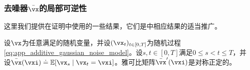 \documentclass[../../book-main_zh.tex]{subfiles}
\begin{document}
\subsubsection{去噪器\(\bar{\vx}\)的局部可逆性}

这里我们提供在证明中使用的一些结果，它们是\cite{Gribonval2011-pf}中相应结果的适当推广。

\begin{lemma}\label{lem:gribonval_A1}
    设\(\vx\)为任意满足的随机变量，并设\((\vx_{t})_{t \in [0, T]}\)为随机过程\eqref{eq:app_additive_gaussian_noise_model}。设\(s, t \in [0, T]\)满足\(0 \leq s < t \leq T\)，并设\(\bar{\vx}(\vxi) \doteq \Ex[\vx_{s} \mid \vx_{t} = \vxi]\)。雅可比矩阵\(\bar{\vx}^{\prime}(\vxi)\)是对称正定的。
\end{lemma}
\end{document}
